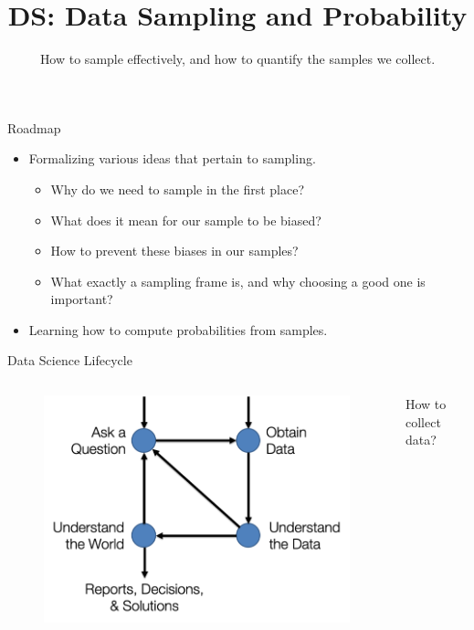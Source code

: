 \documentclass[aspectratio=169]{../latex_main/tntbeamer}  %
\title[Introduction]{DS: Data Sampling and Probability}
\subtitle{How to sample effectively, and how to quantify the samples we collect.}
\begin{document}
	
	\maketitle
	
	\begin{frame}{Roadmap}
	    \begin{itemize}
	        \item Formalizing various ideas that pertain to sampling.
	        \begin{itemize}
	            \item Why do we need to sample in the first place?
	            \item What does it mean for our sample to be biased?
	            \item How to prevent these biases in our samples?
	            \item What exactly a sampling frame is, and why choosing a good one is important?
	        \end{itemize}
	        \item Learning how to compute probabilities from samples.
		    \end{itemize}
	\end{frame}
	
	\begin{frame}[c]{Data Science Lifecycle}
	    \begin{columns}
	        \begin{column}{.4\textwidth}
	        \begin{figure}
	            \includegraphics[scale=.6]{Bild1}
	        \end{figure}
	        \end{column}
	            
	        \begin{column}{.4\textwidth}
         
	                How to collect data?
                 
	        \end{column}

	    \end{columns}
	\end{frame}
\end{document}
